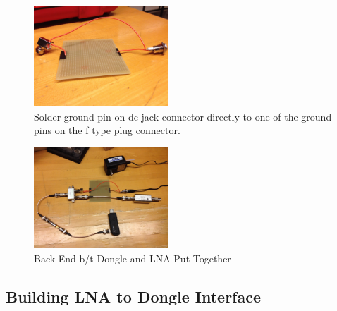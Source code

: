 \documentclass[11pt]{article} %
\begin{document}
\begin{figure}
  \centering
  \caption{Solder ground pin on dc jack connector directly to one of the ground pins on the f type plug connector. }
  \includegraphics[width=0.45\textwidth]{lna/10.jpeg}
\end{figure}


\begin{figure}
  \centering
  \caption{Back End b/t Dongle and LNA Put Together }
  \includegraphics[width=0.45\textwidth]{lna/11.jpeg}
\end{figure}




\subsection{Building LNA to Dongle Interface}
\end{document}
